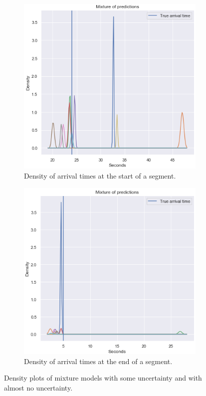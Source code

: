 \begin{figure}[H]
  \begin{subfigure}[b]{0.5\textwidth}
    \includegraphics[width=\textwidth]{figures/mixture-start-of-traj.png}
    \caption{Density of arrival times at the start of a segment.}
    \label{fig:mixture-start-of-traj}
  \end{subfigure}
  \begin{subfigure}[b]{0.5\textwidth}
    \includegraphics[width=\textwidth]{figures/mixture-end-of-traj.png}
    \caption{Density of arrival times at the end of a segment.}
    \label{fig:mixture-end-of-traj}
  \end{subfigure}
  \caption{Density plots of mixture models with some uncertainty and
    with almost no uncertainty.}
\end{figure}

